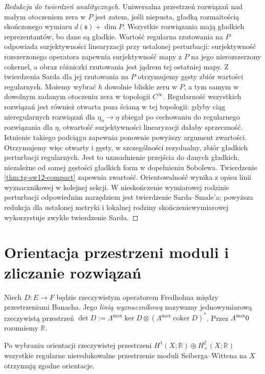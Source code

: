 \begin{proof}[Redukcja do twierdzeń analitycznych]
Uniwersalna przestrzeń rozwiązań nad małym
otoczeniem zera w $P$ jest zatem, jeśli niepusta,
gładką rozmaitością skończonego wymiaru
$d(\mathfrak s)+\dim P$. Wszystkie rozwiązania
mają gładkich reprezentantów, bo dane są gładkie.
Wartość regularna rzutowania na $P$ odpowiada
surjektywności linearyzacji przy ustalonej
perturbacji: surjektywność rozszerzonego operatora
zapewnia surjektywność mapy z $P$ na jego
nierozszerzony cokernel, a obraz różniczki
rzutowania jest jądrem tej ostatniej mapy.
Z twierdzenia Sarda dla jej rzutowania na $P$
otrzymujemy gęsty zbiór wartości regularnych.
Możemy wybrać $h$ dowolnie bliskie zeru
w $P$, a tym samym w dowolnym zadanym
otoczeniu zera w topologii $C^\infty$.
Regularność wszystkich rozwiązań jest
również otwarta poza ścianą w tej topologii:
gdyby ciąg nieregularnych rozwiązań dla
$\eta_n\to\eta$ zbiegał po cechowaniu
do regularnego rozwiązania dla $\eta$,
otwartość surjektywności linearyzacji
dałaby sprzeczność. Istnienie takiego
podciągu zapewnia ponownie powyższy
argument zwartości. Otrzymujemy więc
otwarty i gęsty, w szczególności rezydualny,
zbiór gładkich perturbacji regularnych.
Jest to uzasadnienie przejścia do danych
gładkich, niezależne od samej gęstości
gładkich form w dopełnieniu Sobolewa.
Twierdzenie \ref{thm:tg-sw12-compact} zapewnia zwartość.
Orientowalność wynika z opisu linii wyznacznikowej
w kolejnej sekcji. W nieskończenie wymiarowej rodzinie perturbacji
odpowiednim narzędziem jest twierdzenie
Sarda--Smale'a; powyższa redukcja dla ustalonej
metryki i lokalnej rodziny skończeniewymiarowej
wykorzystuje zwykłe twierdzenie Sarda.
\end{proof}

\section{Orientacja przestrzeni moduli i zliczanie rozwiązań}
\label{sec:tg-sw12-orientation}

\begin{definicja}
Niech $D:E\to F$ będzie rzeczywistym operatorem Fredholma
między przestrzeniami Banacha. Jego \emph{linią wyznacznikową}
nazywamy jednowymiarową rzeczywistą przestrzeń
$\det D:=\Lambda^{\max}\ker D\otimes
(\Lambda^{\max}\operatorname{coker}D)^*$.
Przez $\Lambda^{\max}0$ rozumiemy $\mathbb R$.
\end{definicja}

\begin{stwierdzenie}
\label{prop:tg-sw12-hom-orient}
Po wybraniu orientacji rzeczywistej przestrzeni
$H^1(X;\mathbb R)\oplus H^2_+(X;\mathbb R)$
wszystkie regularne nieredukowalne przestrzenie moduli
Seiberga--Wittena na $X$ otrzymują zgodne orientacje.
\end{stwierdzenie}

